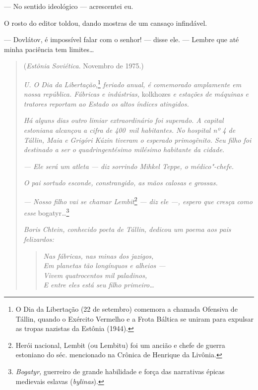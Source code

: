 --- No sentido ideológico --- acrescentei eu.

O rosto do editor toldou, dando mostras de um cansaço infindável.

--- Dovlátov, é impossível falar com o senhor! --- disse ele. --- Lembre
que até minha paciência tem limites\ldots{}


\movetooddpage
\begin{center}
{}
\end{center}

\begin{quotation}
\begin{flushright}
(\emph{Estônia Soviética}. Novembro de 1975.)
\end{flushright}
\vspace{4pt}
\noindent\emph{U. O Dia da Libertação,}\footnote{O Dia da
  Libertação (22 de setembro) comemora a chamada Ofensiva de Tállin,
  quando o Exército Vermelho e a Frota Báltica se uniram para expulsar
  as tropas nazistas da Estônia (1944).} \emph{feriado anual, é
comemorado amplamente em nossa república. Fábricas e indústrias,}
kolkhozes \emph{e estações de máquinas e tratores reportam ao Estado os
altos índices atingidos.}

\emph{Há alguns dias outro limiar extraordinário foi superado. A capital
estoniana alcançou a cifra de 400~mil habitantes. No hospital nº 4 de
Tállin, Maia e Grigóri Kúzin tiveram o esperado primogênito. Seu filho
foi destinado a ser o quadringentésimo milésimo habitante da cidade.}

\emph{--- Ele será um atleta --- diz sorrindo Mihkel Teppe, o
médico"-chefe.}

\emph{O pai sortudo esconde, constrangido, as mãos calosas e grossas.}

\emph{--- Nosso filho vai se chamar Lembit}\footnote{Herói nacional,
  Lembit (ou Lembitu) foi um ancião e chefe de guerra estoniano do séc.
   mencionado na Crônica de Henrique da Livônia.} \emph{--- diz ele
---, espero que cresça como esse} bogatyr\emph{\ldots{}}\footnote{\emph{Bogatyr,}
  guerreiro de grande habilidade e força das narrativas épicas medievais
  eslavas (\emph{bylinas}).}

\emph{Boris Chtein, conhecido poeta de Tállin, dedicou um poema aos pais
felizardos:}

\begin{verse}
\emph{Nas fábricas, nas minas dos jazigos,}\\
\emph{Em planetas tão longínquos e \qb{}alheios ---}\\
\emph{Vivem quatrocentos mil paladinos,}\\
\emph{E entre eles está seu filho primeiro\ldots{}}
\end{verse}


\end{quotation}
